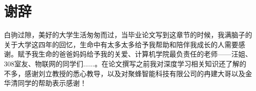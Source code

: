 \section*{谢辞}
白驹过隙，美好的大学生活匆匆而过，当毕业论文写到这章节的时候，我满脑子的关于大学这四年的回忆，生命中有太多太多给予我帮助和陪伴我成长的人需要感谢。赋予我生命的爸爸妈妈给予我的关爱、计算机学院最负责任的老师——汪姐、308室友、物联网的同学们......。在论文撰写之前我对深度学习相关知识还了解的不多，感谢刘立教授的悉心教导，以及对聚蜂智能科技有限公司的冉建大哥以及金华清同学的帮助表示感谢！